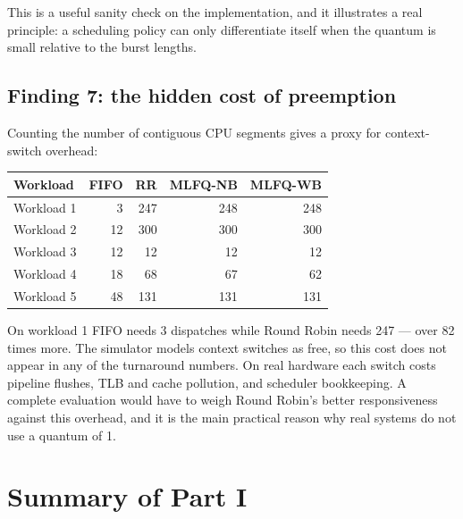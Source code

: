 \documentclass[11pt,a4paper]{article}
\begin{document}
This is a useful sanity check on the implementation, and it illustrates a real principle: a
scheduling policy can only differentiate itself when the quantum is small relative to the
burst lengths.

\subsection{Finding 7: the hidden cost of preemption}

Counting the number of contiguous CPU segments gives a proxy for context-switch overhead:

\begin{center}\small
\begin{tabular}{lrrrr}
\toprule
\textbf{Workload} & \textbf{FIFO} & \textbf{RR} & \textbf{MLFQ-NB} & \textbf{MLFQ-WB}\\
\midrule
Workload 1 & 3 & 247 & 248 & 248 \\
Workload 2 & 12 & 300 & 300 & 300 \\
Workload 3 & 12 & 12 & 12 & 12 \\
Workload 4 & 18 & 68 & 67 & 62 \\
Workload 5 & 48 & 131 & 131 & 131 \\
\bottomrule\end{tabular}\end{center}

On workload 1 FIFO needs 3 dispatches while Round Robin needs 247 --- over 82 times more.
The simulator models context switches as free, so this cost does not appear in any of the
turnaround numbers. On real hardware each switch costs pipeline flushes, TLB and cache
pollution, and scheduler bookkeeping. A complete evaluation would have to weigh Round Robin's
better responsiveness against this overhead, and it is the main practical reason why real
systems do not use a quantum of 1.

\section{Summary of Part I}
\end{document}
